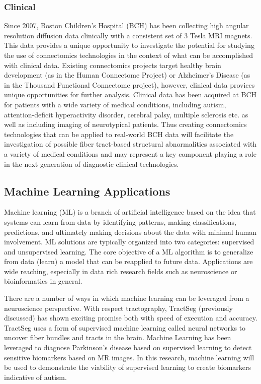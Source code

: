 \subsubsection {Clinical}
Since 2007, Boston Children’s Hospital (BCH) has been collecting high angular 
resolution diffusion data clinically with a consistent set of 3 Tesla MRI 
magnets. This data provides a unique opportunity to investigate the potential 
for studying the use of connectomics technologies in the context of what can be accomplished with clinical data. Existing connectomics projects target healthy brain development (as in the Human Connectome Project) or Alzheimer’s Disease (as in the Thousand Functional Connectome project), however, clinical data provices unique opportunities for further analysis. Clinical data has been acquired at BCH for patients with a wide variety of medical conditions, 
including autism, attention-deficit hyperactivity disorder, cerebral palsy, 
multiple sclerosis etc. as well as including imaging of neurotypical patients. 
Thus creating connectomics technologies that can be applied to real-world BCH 
data will facilitate the investigation of possible fiber tract-based structural 
abnormalities associated with a variety of medical conditions and may represent 
a key component playing a role in the next generation of diagnostic clinical 
technologies.

\subsection {Machine Learning Applications}

Machine learning (ML) is a branch of artificial intelligence based on the idea 
that systems can learn from data by identifying patterns, making classifications, 
predictions, and ultimately making decisions about the data with minimal human 
involvement.  ML solutions are typically organized into two categories: 
supervised and unsupervised learning.  The core objective of a ML algorithm is 
to generalize from data (learn) a model that can be reapplied to future data.  
Applications are wide reaching, especially in data rich research fields such 
as neuroscience or bioinformatics in general.  

There are a number of ways in which machine learning can be leveraged from a 
neuroscience perspective.  With respect tractography, TractSeg (previously 
discussed) has shown exciting promise both with speed of execution and accuracy.  
TractSeg uses a form of supervised machine learning called neural networks to 
uncover fiber bundles and tracts in the brain\cite{wasserthal}.  Machine 
Learning has been leveraged to diagnose Parkinson’s disease based on supervised 
learning to detect sensitive biomarkers based on MR images\cite{salvatore}. 
In this research, machine learning will be used to demonstrate the viability of 
supervised learning to create biomarkers indicative of autism.

